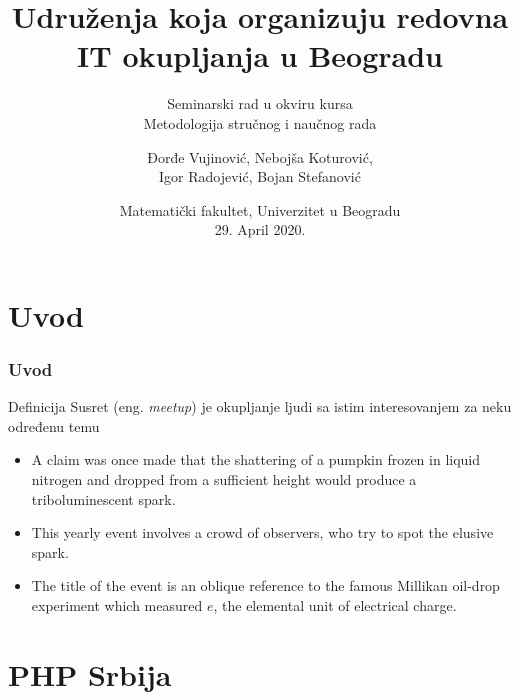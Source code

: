 \documentclass[hyperref={bookmarks=false},aspectratio=169]{beamer}
\title[]
{\bfseries{Udruženja koja organizuju redovna IT okupljanja u Beogradu}}
\subtitle{Seminarski rad u okviru kursa\\Metodologija stručnog i naučnog rada}
\author[]
{Đorđe Vujinović, Nebojša Koturović, \\Igor Radojević, Bojan Stefanović}
\date[ICUP, 2014]
{Matematički fakultet, Univerzitet u Beogradu\\29. April 2020.}
\begin{document}
\frame{\titlepage}  %


\section{Uvod}

\begin{frame}
\frametitle{Uvod}
\begin{block}{Definicija}
Susret (eng. \textit{meetup}) je okupljanje ljudi sa istim interesovanjem za neku određenu temu
\end{block}

\begin{itemize}
    \item A claim was once made that the shattering of a pumpkin frozen in liquid nitrogen and dropped from a sufficient height would produce a triboluminescent spark. 
    \item This yearly event involves a crowd of observers, who try to spot the elusive spark.
    \item The title of the event is an oblique reference to the famous Millikan oil-drop experiment which measured $e$, the elemental unit of electrical charge.
\end{itemize}

\end{frame}



%
%

\section{PHP Srbija}
\end{document}
